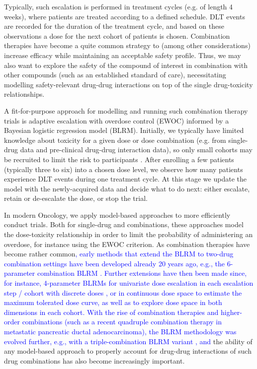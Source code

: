 \documentclass[AMA,STIX1COL]{WileyNJD-v2}
\newcommand{\revision}[1]{\textcolor{blue}{#1}}
\begin{document}
Typically, such escalation is performed in treatment cycles (e.g. of length 4 weeks), where patients are treated according to a defined schedule. DLT events are recorded for the duration of the treatment cycle, and based on these observations a dose for the next cohort of patients is chosen. Combination therapies have become a quite common strategy to (among other considerations) increase efficacy \cite{Mokhtari2017, Palmer2017} while maintaining an acceptable safety profile. Thus, we may also want to explore the safety of the compound of interest in combination with other compounds (such as an established standard of care), necessitating modelling safety-relevant drug-drug interactions on top of the single drug-toxicity relationships.

A fit-for-purpose approach for modelling and running such combination therapy trials is adaptive escalation with overdose control (EWOC) informed by a Bayesian logistic regression model (BLRM)\cite{Neuenschwander2014}. Initially, we typically have limited knowledge about toxicity for a given dose or dose combination (e.g. from single-drug data and pre-clinical drug-drug interaction data), so only small cohorts may be recruited to limit the risk to participants \cite{Babb1998}. After enrolling a few patients (typically three to six) into a chosen dose level, we observe how many patients experience DLT events during one treatment cycle. At this stage we update the model with the newly-acquired data and decide what to do next: either escalate, retain or de-escalate the dose, or stop the trial. 

In modern Oncology, we apply model-based approaches to more efficiently conduct trials. Both for single-drug and combinations, these approaches model the dose-toxicity relationship in order to limit the probability of administering an overdose, for instance using the EWOC criterion. As combination therapies have become rather common\revision{, early methods that extend the BLRM to two-drug combination settings have been developed already 20 years ago, e.g., the 6-parameter combination BLRM \cite{Thall2003}. Further extensions have then been made since, for instance, 4-parameter BLRMs for univariate dose escalation in each escalation step / cohort with discrete doses \cite{Shi2013}, or in continuous dose space to estimate the maximum tolerated dose curve\cite{Tighiouart2014}, as well as to explore dose space in both dimensions in each cohort\cite{Tighiouart2017}. With the rise of combination therapies and higher-order combinations (such as a recent quadruple combination therapy in metastatic pancreatic ductal adenocarcinoma\cite{Wainberg2023}), the BLRM methodology was evolved further, e.g., with a triple-combination BLRM variant \cite{Tighiouart2016}, and} the ability of any model-based approach to properly account for drug-drug interactions of such drug combinations has also become increasingly important. 
\end{document}
